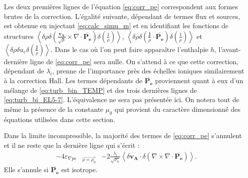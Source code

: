 Les deux premières lignes de l'équation \eqref{eq:corr_pe} correspondent aux formes brutes de la correction. L'égalité suivante, dépendant de termes flux et sources, est obtenue en injectant \eqref{eq:calc_simu_m} et en identifiant les fonctions de structures $\left<\delta \rho \delta \left( \frac{\boldsymbol{v_A} }{\sqrt{\rho}} \times \nabla \cdot \overline{\boldsymbol{P_{e}}}\right) \delta \left(\frac{1}{\rho} \right)\right>$, $\left<\delta \rho \delta \left( \frac{ \boldsymbol{j}}{\rho} \cdot \overline{\boldsymbol{P_{e}}}\right) \delta \left(\frac{1}{\rho} \right) \right>$ et $\left<\delta \rho \delta u_e \delta \left(\frac{\boldsymbol{j}}{\rho} \right)\right>$.  Dans le cas où l'on peut faire apparaître l'enthalpie $h$, l'avant-dernière ligne de \eqref{eq:corr_pe} sera nulle.  On s'attend à ce que cette correction, dépendant de $\lambda_i$, prenne de l'importance près des échelles ioniques similairement à la correction \acs{Hall}. Les termes dépendants de $\overline{\boldsymbol{P_{e}}}$ proviennent quant à eux d'un mélange de \eqref{eq:turb_bin_TEMP} et des trois dernières lignes de \eqref{eq:turb_bi_EL5-7}. L'équivalence ne sera pas présentée ici. On notera tout de même la présence de la constante $\mu_0$ qui provient du caractère dimensionné des équations utilisées dans cette section. 

Dans la limite incompressible, la majorité des termes de \eqref{eq:corr_pe} s'annulent et il ne reste que la dernière ligne qui s'écrit : 
\begin{equation}
\label{eq:corr_hallpeinc} \boxed{
\begin{array}{lcl}
   -4 \varepsilon_{\nabla pe} &{}_{\overrightarrow{\rho = \rho_0}}& - 2 \frac{\lambda_i}{\sqrt{\rho_0}} \left< \delta \boldsymbol{v_A} \cdot \delta (\nabla \times \nabla \cdot \overline{\boldsymbol{P_{e}}}) \right> .
   \end{array}}
\end{equation} 
Elle s'annule si $\overline{\boldsymbol{P_{e}}}$ est isotrope. 

